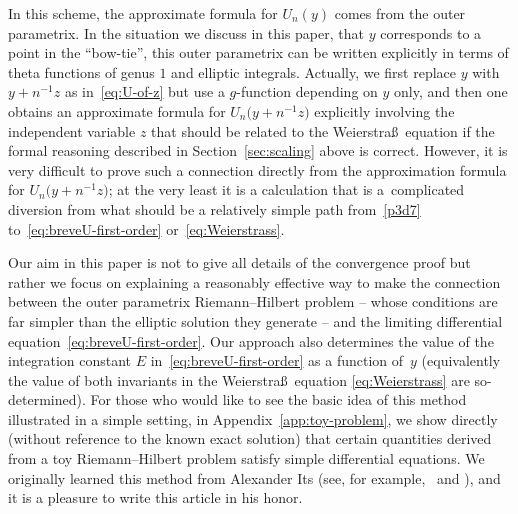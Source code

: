 In this scheme, the approximate formula for $U_n(y)$ comes from the outer parametrix.
In the situation we discuss in this paper, that $y$ corresponds to a point in the
``bow-tie'', this outer parametrix can be written explicitly in terms of theta
functions of genus $1$ and elliptic integrals. Actually, we first replace $y$ with
$y+n^{-1}z$ as in~\eqref{eq:U-of-z} but use a $g$-function depending on $y$ only, and
then one obtains an approximate formula for $U_n\bigl(y+n^{-1}z\bigr)$ explicitly involving the
independent variable $z$ that should be related to the Weierstra\ss\ equation if the
formal reasoning described in Section~\ref{sec:scaling} above is correct. However,
it is very difficult to prove such a connection directly from the approximation
formula for $U_n\bigl(y+n^{-1}z\bigr)$; at the very least it is a calculation that is a~complicated
diversion from what should be a relatively simple path from~\eqref{p3d7}
to~\eqref{eq:breveU-first-order} or~\eqref{eq:Weierstrass}.

Our aim in this paper is not to give all details of the convergence proof but rather
we focus on explaining a reasonably effective way to make the connection between the
outer parametrix Riemann--Hilbert problem -- whose conditions are far simpler than
the elliptic solution they generate -- and the limiting differential equation~\eqref{eq:breveU-first-order}. Our approach also determines the value of the
integration constant $E$ in~\eqref{eq:breveU-first-order} as a function of~$y$
(equivalently the value of both invariants in the Weierstra\ss\ equation
\eqref{eq:Weierstrass} are so-determined).
For those who would like to see the basic idea of this method illustrated
in a simple setting, in Appendix~\ref{app:toy-problem}, we show directly (without
reference to the known exact solution) that certain quantities derived from
a toy Riemann--Hilbert problem satisfy simple differential equations.
We originally learned this method from
Alexander Its (see, for example,~\cite[Chapter~8]{FokasIKN:2006} and
\cite{ItsK:2002}),
and it is a pleasure to write this article in his honor.

